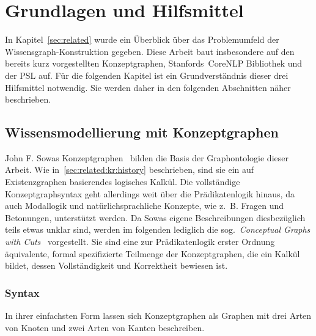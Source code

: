 \chapter{Grundlagen und Hilfsmittel}%
\label{sec:theory}

In Kapitel~\ref{sec:related} wurde ein Überblick über das Problemumfeld der Wissensgraph-Konstruktion gegeben.
Diese Arbeit baut insbesondere auf den bereits kurz vorgestellten Konzeptgraphen, Stanfords~CoreNLP Bibliothek und der PSL auf.
Für die folgenden Kapitel ist ein Grundverständnis dieser drei Hilfsmittel notwendig.
Sie werden daher in den folgenden Abschnitten näher beschrieben.

\section{Wissensmodellierung mit Konzeptgraphen}%
\label{sec:theory:cg}

John F. Sowas Konzeptgraphen~\cite{Sowa1976} bilden die Basis der Graphontologie dieser Arbeit.
Wie in~\ref{sec:related:kr:history} beschrieben, sind sie ein auf Existenzgraphen basierendes logisches Kalkül.
Die vollständige Konzeptgraphsyntax geht allerdings weit über die Prädikatenlogik hinaus, da auch Modallogik und natürlichsprachliche Konzepte, wie z.~B. Fragen und Betonungen, unterstützt werden.
Da Sowas eigene Beschreibungen diesbezüglich teils etwas unklar sind, werden im folgenden lediglich die sog.~\textit{Conceptual Graphs with Cuts}~\cite{Dau2003} vorgestellt.
Sie sind eine zur Prädikatenlogik erster Ordnung äquivalente, formal spezifizierte Teilmenge der Konzeptgraphen, die ein Kalkül bildet, dessen Vollständigkeit und Korrektheit bewiesen ist.

\subsection{Syntax}%
\label{sec:theory:cg:syntax}

In ihrer einfachsten Form lassen sich Konzeptgraphen als Graphen mit drei Arten von Knoten und zwei Arten von Kanten beschreiben.

